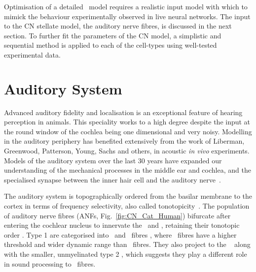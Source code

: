
Optimisation of a detailed \BNN~model requires a realistic input model with which to mimick the behaviour experimentally observed in live neural networks. The input to the CN stellate model, the auditory nerve fibres, is discussed in the next section. To further fit the parameters of the CN model, a simplistic and sequential method is applied to each of the cell-types using well-tested experimental data.


\section{Auditory System    \label{sec:CN:auditory-model}}

Advanced auditory fidelity and localisation is an exceptional feature of hearing perception in animals.
This speciality works to a high degree despite the input at the round window of the cochlea being one dimensional and very noisy.
Modelling in the auditory periphery has benefited extensively from the work of Liberman, Greenwood, Patterson, Young, Sachs and others, in acoustic \textit{in vivo} experiments.
Models of the auditory system over the last 30 years have expanded our understanding of the mechanical processes in the middle ear and cochlea, and the specialised synapse between the inner hair cell and the auditory nerve~\citep{DavisVoigt:1991,Carney:1993,MeddisHewittEtAl:1990}.


The auditory system is topographically ordered from the basilar membrane to the cortex in terms of frequency selectivity, also called tonotopicity~\citep{YoungOertel:2004}.
The population of auditory nerve fibres (ANFs, Fig.~\ref{fig:CN_Cat_Human}) bifurcate after entering the cochlear nucleus to innervate the \VCN~and \DCN, retaining their tonotopic order \citep{Lorente:1981,Liberman:1982,Liberman:1993}.
Type 1 \ANFs are categorised into {\HSR}~and {\LSR}~fibres \citep{Liberman:1978}, where \LSR~fibres have a higher threshold and wider dynamic range than \HSR~fibres.
They also project to the \GCD~\citep{RyugoParks:2003, RyugoHaenggeliEtAl:2003} along with the smaller, unmyelinated type 2 \ANFs, which suggests they play a different role in sound processing to \HSR~fibres.

